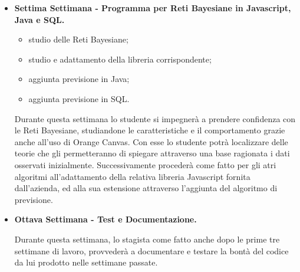 \begin{itemize}
	\item \textbf{Settima Settimana - Programma per Reti Bayesiane in Javascript, Java e SQL.}
\begin{itemize}
	\item studio delle Reti Bayesiane;
	\item studio e adattamento della libreria corrispondente;
	\item aggiunta previsione in Java;
	\item aggiunta previsione in SQL.
	\end{itemize}
	Durante questa settimana lo studente si impegnerà a prendere confidenza con le Reti Bayesiane, studiandone le caratteristiche e il comportamento grazie anche all'uso di Orange Canvas. Con esse lo studente potrà localizzare delle teorie che gli permetteranno di spiegare attraverso una base ragionata i dati osservati inizialmente. Successivamente procederà come fatto per gli atri algoritmi all'adattamento della relativa libreria Javascript fornita dall'azienda, ed alla sua estensione attraverso l'aggiunta del algoritmo di previsione.
	
	\item \textbf{Ottava Settimana - Test e Documentazione.}
	 \par Durante questa settimana, lo stagista come fatto anche dopo le prime tre settimane di lavoro, provvederà a documentare e testare la bontà del codice da lui prodotto nelle settimane passate.

\end{itemize}